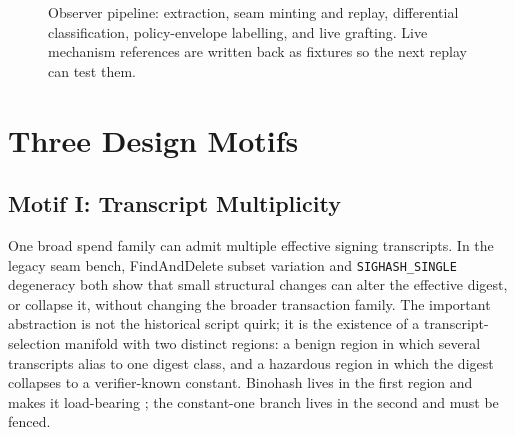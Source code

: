 \documentclass[11pt]{article}
\begin{document}
\begin{figure}[t]
\centering
{}
\caption{Observer pipeline: extraction, seam minting and replay, differential
classification, policy-envelope labelling, and live grafting. Live mechanism
references are written back as fixtures so the next replay can test them.}
\label{fig:observer-pipeline}
\end{figure}

\section{Three Design Motifs}
\label{sec:motifs}

\subsection{Motif I: Transcript Multiplicity}

One broad spend family can admit multiple effective signing transcripts. In the
legacy seam bench, FindAndDelete subset variation and \texttt{SIGHASH\_SINGLE}
degeneracy both show that small structural changes can alter the effective
digest, or collapse it, without changing the broader transaction family. The
important abstraction is not the historical script quirk; it is the existence
of a transcript-selection manifold with two distinct regions: a benign region in
which several transcripts alias to one digest class, and a hazardous region in
which the digest collapses to a verifier-known constant. Binohash lives in the
first region and makes it load-bearing \cite{linus2026binohash}; the
constant-one branch lives in the second and must be fenced.
\end{document}
